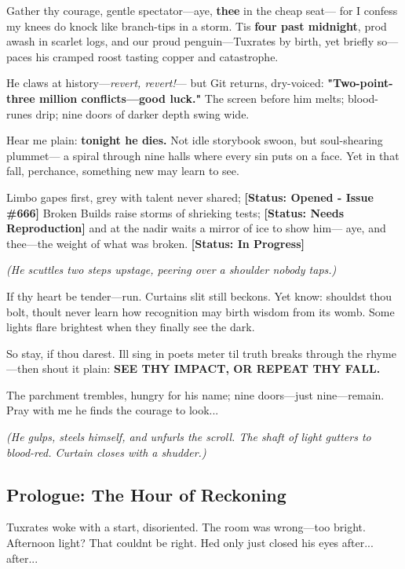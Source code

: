 Gather thy courage, gentle spectator---aye, \textbf{thee} in the cheap seat--- for I confess my knees do knock like branch-tips in a storm. \textquotesingle Tis \textbf{four past midnight}, prod awash in scarlet logs, and our proud penguin---Tuxrates by birth, yet briefly so--- paces his cramped roost tasting copper and catastrophe.

He claws at history---\emph{revert, revert!}--- but Git returns, dry-voiced: \textbf{"Two-point-three million conflicts---good luck."} The screen before him melts; blood-runes drip; nine doors of darker depth swing wide.

Hear me plain: \textbf{tonight he dies.} Not idle storybook swoon, but soul-shearing plummet--- a spiral through nine halls where every sin puts on a face. Yet in that fall, perchance, something new may learn to see.

Limbo gapes first, grey with talent never shared; \textbf{{[}Status: Opened - Issue \#666{]}} Broken Builds raise storms of shrieking tests; \textbf{{[}Status: Needs Reproduction{]}} and at the nadir waits a mirror of ice to show him--- aye, and thee---the weight of what was broken. \textbf{{[}Status: In Progress{]}}

\emph{(He scuttles two steps upstage, peering over a shoulder nobody taps.)}

If thy heart be tender---run. Curtain\textquotesingle s slit still beckons. Yet know: shouldst thou bolt, thou\textquotesingle lt never learn how recognition may birth wisdom from its womb. Some lights flare brightest when they finally see the dark.

So stay, if thou darest. I\textquotesingle ll sing in poet\textquotesingle s meter \textquotesingle til truth breaks through the rhyme---then shout it plain: \textbf{SEE THY IMPACT, OR REPEAT THY FALL.}

The parchment trembles, hungry for his name; nine doors---just nine---remain. Pray with me he finds the courage to look...

\emph{(He gulps, steels himself, and unfurls the scroll. The shaft of light gutters to blood-red. Curtain closes with a shudder.)}

\bookdivider

\subsection{Prologue: The Hour of Reckoning}\label{prologue-the-hour-of-reckoning}

Tuxrates woke with a start, disoriented. The room was wrong---too bright. Afternoon light? That couldn\textquotesingle t be right. He\textquotesingle d only just closed his eyes after... after...

